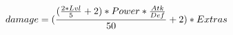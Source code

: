 \documentclass[preview]{standalone}
\begin{document}
\begin{align*}
\special{dvisvgm:raw <g id='unique000'>}damage = (\frac{(\frac{2 * Lvl}{5} + 2) * Power * \frac{Atk}{Def}}{50} + 2) * Extras\special{dvisvgm:raw </g>}
\end{align*}
\end{document}
